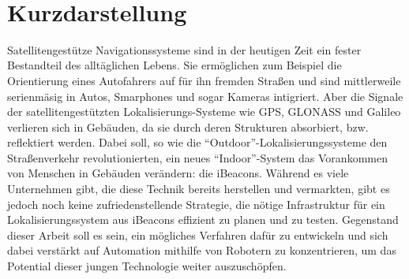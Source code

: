 \maketitle 
\newpage\thispagestyle{empty}~
\newpage
\setcounter{tocdepth}{2}

\section*{Kurzdarstellung}
Satellitengestütze Navigationssysteme sind in der heutigen Zeit ein fester Bestandteil des alltäglichen Lebens. Sie ermöglichen zum Beispiel die Orientierung eines Autofahrers auf für ihn fremden Straßen und sind mittlerweile serienmäsig in Autos, Smarphones und sogar Kameras intigriert. Aber die Signale der satellitengestützten Lokalisierungs-Systeme wie GPS, GLONASS und Galileo verlieren sich in Gebäuden, da sie durch deren Strukturen absorbiert, bzw. reflektiert werden. Dabei soll, so wie die "`Outdoor"'-Lokalisierungssysteme den Straßenverkehr revolutionierten, ein neues "`Indoor"'-System das Vorankommen von Menschen in Gebäuden verändern: die iBeacons. Während es viele Unternehmen gibt, die diese Technik bereits herstellen und vermarkten, gibt es jedoch noch keine zufriedenstellende Strategie, die nötige Infrastruktur für ein Lokalisierungssystem aus iBeacons effizient zu planen und zu testen. Gegenstand dieser Arbeit soll es sein, ein mögliches Verfahren dafür zu entwickeln und sich dabei verstärkt auf Automation mithilfe von Robotern zu konzentrieren, um das Potential dieser jungen Technologie weiter auszuschöpfen.  